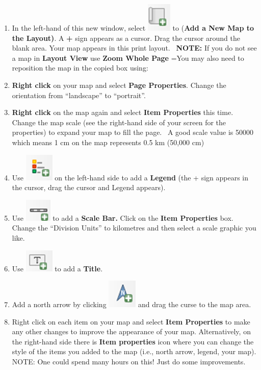 \documentclass[
  letterpaper,
]{book}
\begin{document}
\begin{enumerate}
\def\labelenumi{\Alph{enumi}.}
\setcounter{enumi}{2}
\item
  In the left-hand of this new window, select
  \includegraphics{images/clipboard-3366220892.png} to (\textbf{Add a
  New Map to the Layout)}. A \textbf{+} sign appears as a cursor. Drag
  the cursor around the blank area. Your map appears in this print
  layout. ~\textbf{NOTE:} If you do not see a map in \textbf{Layout
  View} use \textbf{Zoom Whole Page} =You may also need to reposition
  the map in the copied box using:
\item
  \textbf{Right click} on your map and select \textbf{Page Properties}.
  Change the orientation from ``landscape'' to ``portrait''. ~
\item
  \textbf{Right click} on the map again and select \textbf{Item
  Properties} this time. Change the map scale (see the right-hand side
  of your screen for the properties) to expand your map to fill the
  page.~ A good scale value is 50000 which means 1 cm on the map
  represents 0.5 km (50,000 cm)
\item
  Use \includegraphics{images/clipboard-559090363.png} on the left-hand
  side to add a \textbf{Legend} (the + sign appears in the cursor, drag
  the cursor and Legend appears).
\item
  Use \includegraphics{images/clipboard-1747724821.png} to add a
  \textbf{Scale Bar.} Click on the \textbf{Item Properties} box. Change
  the ``Division Units'' to kilometres and then select a scale graphic
  you like.
\item
  Use \includegraphics{images/clipboard-769114577.png} to add a
  \textbf{Title}.
\item
  Add a north arrow by clicking
  \includegraphics{images/clipboard-1756855161.png} and drag the curse
  to the map area.
\item
  Right click on each item on your map and select \textbf{Item
  Properties} to make any other changes to improve the appearance of
  your map. Alternatively, on the right-hand side there is \textbf{Item
  properties} icon where you can change the style of the items you added
  to the map (i.e., north arrow, legend, your map). NOTE: One could
  spend many hours on this! Just do some improvements.
\end{enumerate}
\end{document}
